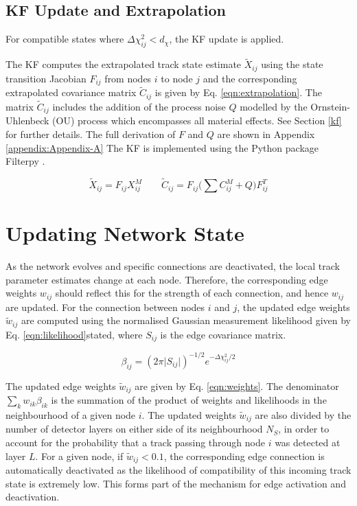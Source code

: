 \subsection{KF Update and Extrapolation}

For compatible states where $\Delta \chi^{2}_{ij} < d_{\chi}$, the KF update is applied.

The KF computes the extrapolated track state estimate $\tilde{X}_{ij}$ using the state transition Jacobian $F_{ij}$ from nodes $i$ to node $j$ and the corresponding extrapolated covariance matrix $\widetilde{C}_{ij}$ is given by Eq. \eqref{eqn:extrapolation}. The matrix $\widetilde{C}_{ij}$ includes the addition of the process noise $Q$ modelled by the Ornstein-Uhlenbeck (OU) process \cite{OU} which encompasses all material effects. See Section \ref{kf} for further details. The full derivation of $F$ and $Q$ are shown in Appendix \ref{appendix:Appendix-A} The KF is implemented using the Python package Filterpy \cite{filterpy}.

\begin{equation}
\tilde{X}_{ij} = F_{ij} X_{ij}^{M} \qquad \tilde{C}_{ij} = F_{ij} \biggl( \sum C_{ij}^{M} + Q \biggl) F^{T}_{ij}
\label{eqn:extrapolation}
\end{equation}






\section{Updating Network State}
\label{gnn-updating-network-state}

As the network evolves and specific connections are deactivated, the local track parameter estimates change at each node. Therefore, the corresponding edge weights $w_{ij}$ should reflect this for the strength of each connection, and hence $w_{ij}$ are updated. For the connection between nodes $i$ and $j$, the updated edge weights $\widetilde{w}_{ij}$ are computed using the normalised Gaussian measurement likelihood given by Eq. \eqref{eqn:likelihood}stated, where $S_{ij}$ is the edge covariance matrix.

\begin{equation}
\beta_{ij} = (2 \pi \lvert S_{ij} \rvert )^{-1/2}  e^{-\Delta \chi^{2}_{ij} / 2}
\label{eqn:likelihood}
\end{equation}


The updated edge weights $\widetilde{w}_{ij}$ are given by Eq. \eqref{eqn:weights}. The denominator $\sum_{k}w_{ik}\beta_{ik}$ is the summation of the product of weights and likelihoods in the neighbourhood of a given node $i$. The updated weights $\widetilde{w}_{ij}$ are also divided by the number of detector layers on either side of its neighbourhood $N_S$, in order to account for the probability that a track passing through node $i$ was detected at layer $L$. For a given node, if $\widetilde{w}_{ij} < 0.1$, the corresponding edge connection is automatically deactivated as the likelihood of compatibility of this incoming track state is extremely low. This forms part of the mechanism for edge activation and deactivation.

